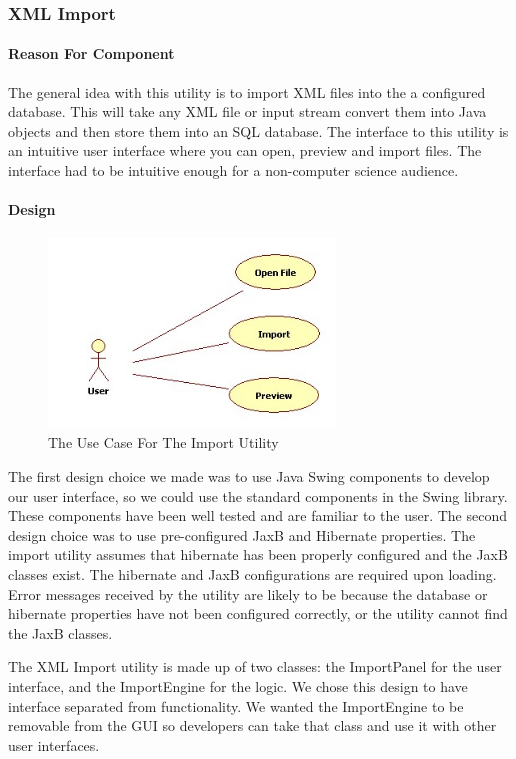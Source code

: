 \subsubsection{XML Import}
\paragraph{Reason For Component}

The general idea with this utility is to import XML files into the a configured database. This will take any XML file or input stream convert them into Java objects and then store them into an SQL database. The interface to this utility is an intuitive user interface where you can open, preview and import files. The interface had to be intuitive enough for a non-computer science audience. 


\paragraph{Design}
\begin{figure}[h]
	\centering
		\includegraphics[width=3.00in]{Images/ImportUse.jpg}
	\caption{The Use Case For The Import Utility}
	\label{fig:Import Use}
\end{figure}
\par
The first design choice we made was to use Java Swing components to develop our user interface, so we could use the standard components in the Swing library. These components have been well tested and are familiar to the user. The second design choice was to use pre-configured JaxB and Hibernate properties. The import utility assumes that hibernate has been properly configured and the JaxB classes exist. The hibernate and JaxB configurations are required upon loading. Error messages received by the utility are likely to be because the database or hibernate properties have not been configured correctly, or the utility cannot find the JaxB classes. 
\par
The XML Import utility is made up of two classes: the ImportPanel for the user interface, and the ImportEngine for the logic. We chose this design to have interface separated from functionality. We wanted the ImportEngine to be removable from the GUI so developers can take that class and use it with other user interfaces. 
